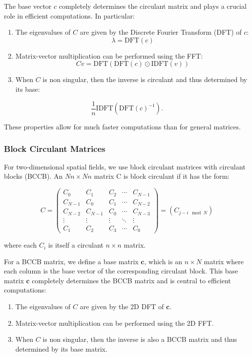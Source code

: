 \documentclass[
  letterpaper,
  DIV=11,
  numbers=noendperiod]{scrartcl}
\begin{document}
The base vector \(c\) completely determines the circulant matrix and
plays a crucial role in efficient computations. In particular:

\begin{enumerate}
\def\labelenumi{\arabic{enumi}.}
\item
  The eigenvalues of \(C\) are given by the Discrete Fourier Transform
  (DFT) of \(c\): \[
  \lambda = \text{DFT}(c)
  \]
\item
  Matrix-vector multiplication can be performed using the FFT: \[
  Cv = \text{DFT}(\text{DFT}(c) \odot \text{IDFT}(v))
  \]
\item
  When \(C\) is non singular, then the inverse is circulant and thus
  determined by its base:
\end{enumerate}

\[
\frac1n \text{IDFT}(\text{DFT}(c)^{-1}).
\]

These properties allow for much faster computations than for general
matrices.

\subsubsection{Block Circulant Matrices}\label{block-circulant-matrices}

For two-dimensional spatial fields, we use block circulant matrices with
circulant blocks (BCCB). An \(Nn \times Nn\) matrix C is block circulant
if it has the form:

\[
C = \begin{pmatrix}
C_0 & C_1 & C_2 & \cdots & C_{N-1} \\
C_{N-1} & C_0 & C_1 & \cdots & C_{N-2} \\
C_{N-2} & C_{N-1} & C_0 & \cdots & C_{N-3} \\
\vdots & \vdots & \vdots & \ddots & \vdots \\
C_1 & C_2 & C_3 & \cdots & C_0
\end{pmatrix} = (C_{j-i \mod N})
\]

where each \(C_i\) is itself a circulant \(n \times n\) matrix.

For a BCCB matrix, we define a base matrix \(\mathbf c\), which is an
\(n \times N\) matrix where each column is the base vector of the
corresponding circulant block. This base matrix \(\mathbf c\) completely
determines the BCCB matrix and is central to efficient computations:

\begin{enumerate}
\def\labelenumi{\arabic{enumi}.}
\item
  The eigenvalues of \(C\) are given by the 2D DFT of \(\mathbf c\).
\item
  Matrix-vector multiplication can be performed using the 2D FFT.
\item
  When \(C\) is non singular, then the inverse is also a BCCB matrix and
  thus determined by its base matrix.
\end{enumerate}
\end{document}
